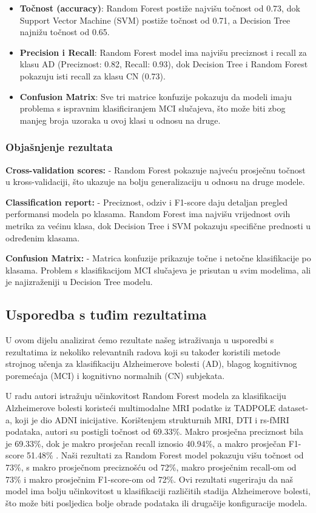 \documentclass[zavrsnirad]{fer}
\begin{document}
\begin{itemize}
	\item \textbf{Točnost (accuracy)}: Random Forest postiže najvišu točnost od 0.73, dok Support Vector Machine (SVM) postiže točnost od 0.71, a Decision Tree najnižu točnost od 0.65.
	\item \textbf{Precision i Recall}: Random Forest model ima najvišu preciznost i recall za klasu AD (Preciznost: 0.82, Recall: 0.93), dok Decision Tree i Random Forest pokazuju isti recall za klasu CN (0.73).
	\item \textbf{Confusion Matrix}: Sve tri matrice konfuzije pokazuju da modeli imaju problema s ispravnim klasificiranjem MCI slučajeva, što može biti zbog manjeg broja uzoraka u ovoj klasi u odnosu na druge.
\end{itemize}

\subsubsection{Objašnjenje rezultata}
\textbf{Cross-validation scores:}
- Random Forest pokazuje najveću prosječnu točnost u kross-validaciji, što ukazuje na bolju generalizaciju u odnosu na druge modele.

\textbf{Classification report:}
- Preciznost, odziv i F1-score daju detaljan pregled performansi modela po klasama. Random Forest ima najvišu vrijednost ovih metrika za većinu klasa, dok Decision Tree i SVM pokazuju specifične prednosti u određenim klasama.

\textbf{Confusion Matrix:}
- Matrica konfuzije prikazuje točne i netočne klasifikacije po klasama. Problem s klasifikacijom MCI slučajeva je prisutan u svim modelima, ali je najizraženiji u Decision Tree modelu.


\subsection{Usporedba s tuđim rezultatima}

U ovom dijelu analizirat ćemo rezultate našeg istraživanja u usporedbi s rezultatima iz nekoliko relevantnih radova koji su također koristili metode strojnog učenja za klasifikaciju Alzheimerove bolesti (AD), blagog kognitivnog poremećaja (MCI) i kognitivno normalnih (CN) subjekata.


U radu \cite{MultimodalRF} autori istražuju učinkovitost Random Forest modela za klasifikaciju Alzheimerove bolesti koristeći multimodalne MRI podatke iz TADPOLE dataset-a, koji je dio ADNI inicijative. Korištenjem strukturnih MRI, DTI i rs-fMRI podataka, autori su postigli točnost od 69.33\%. Makro prosječna preciznost bila je 69.33\%, dok je makro prosječan recall iznosio 40.94\%, a makro prosječan F1-score 51.48\% .
Naši rezultati za Random Forest model pokazuju višu točnost od 73\%, s makro prosječnom preciznošću od 72\%, makro prosječnim recall-om od 73\% i makro prosječnim F1-score-om od 72\%. Ovi rezultati sugeriraju da naš model ima bolju učinkovitost u klasifikaciji različitih stadija Alzheimerove bolesti, što može biti posljedica bolje obrade podataka ili drugačije konfiguracije modela.
\end{document}
